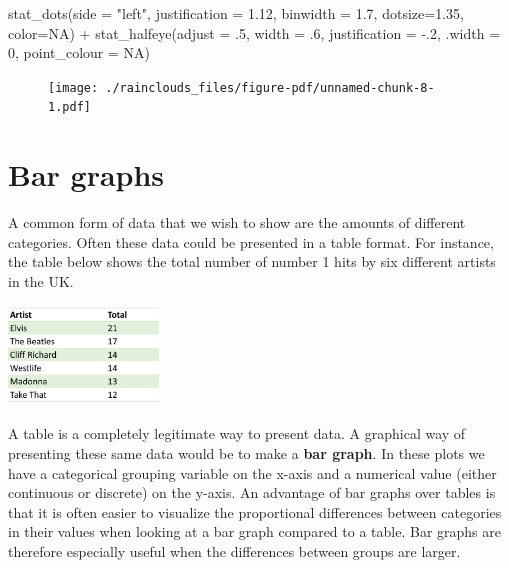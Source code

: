 \documentclass[
  letterpaper,
  DIV=11,
  numbers=noendperiod]{scrreprt}
\newenvironment{Shaded}{\begin{snugshade}}{\end{snugshade}}
\newcommand{\AttributeTok}[1]{\textcolor[rgb]{0.40,0.45,0.13}{#1}}
\newcommand{\ConstantTok}[1]{\textcolor[rgb]{0.56,0.35,0.01}{#1}}
\newcommand{\DecValTok}[1]{\textcolor[rgb]{0.68,0.00,0.00}{#1}}
\newcommand{\FloatTok}[1]{\textcolor[rgb]{0.68,0.00,0.00}{#1}}
\newcommand{\FunctionTok}[1]{\textcolor[rgb]{0.28,0.35,0.67}{#1}}
\newcommand{\NormalTok}[1]{\textcolor[rgb]{0.00,0.23,0.31}{#1}}
\newcommand{\SpecialCharTok}[1]{\textcolor[rgb]{0.37,0.37,0.37}{#1}}
\newcommand{\StringTok}[1]{\textcolor[rgb]{0.13,0.47,0.30}{#1}}
\begin{document}
\begin{Shaded}
\begin{Highlighting}[]
  \FunctionTok{stat\_dots}\NormalTok{(}\AttributeTok{side =} \StringTok{"left"}\NormalTok{, }\AttributeTok{justification =} \FloatTok{1.12}\NormalTok{, }\AttributeTok{binwidth =} \FloatTok{1.7}\NormalTok{, }\AttributeTok{dotsize=}\FloatTok{1.35}\NormalTok{, }\AttributeTok{color=}\ConstantTok{NA}\NormalTok{) }\SpecialCharTok{+}
  \FunctionTok{stat\_halfeye}\NormalTok{(}\AttributeTok{adjust =}\NormalTok{ .}\DecValTok{5}\NormalTok{, }\AttributeTok{width =}\NormalTok{ .}\DecValTok{6}\NormalTok{, }\AttributeTok{justification =} \SpecialCharTok{{-}}\NormalTok{.}\DecValTok{2}\NormalTok{, }\AttributeTok{.width =} \DecValTok{0}\NormalTok{, }\AttributeTok{point\_colour =} \ConstantTok{NA}\NormalTok{)}
\end{Highlighting}
\end{Shaded}

\begin{figure}[H]

{\centering \texttt{[image: ./rainclouds\_files/figure-pdf/unnamed-chunk-8-1.pdf]}

}

\end{figure}


\hypertarget{bar-graphs}{%
\chapter{Bar graphs}\label{bar-graphs}}

A common form of data that we wish to show are the amounts of different
categories. Often these data could be presented in a table format. For
instance, the table below shows the total number of number 1 hits by six
different artists in the UK.

\includegraphics[width=0.3\textwidth,height=\textheight]{./img/tab1.png}

A table is a completely legitimate way to present data. A graphical way
of presenting these same data would be to make a \textbf{bar graph}. In
these plots we have a categorical grouping variable on the x-axis and a
numerical value (either continuous or discrete) on the y-axis. An
advantage of bar graphs over tables is that it is often easier to
visualize the proportional differences between categories in their
values when looking at a bar graph compared to a table. Bar graphs are
therefore especially useful when the differences between groups are
larger.
\end{document}
